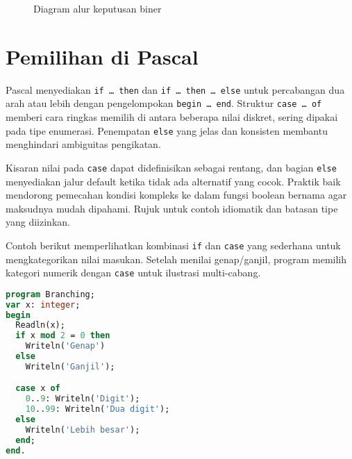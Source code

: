 \documentclass[../main.tex]{subfiles}
\begin{document}
\begin{figure}[h]
  \centering
  \caption{Diagram alur keputusan biner}
  \label{fig:decision-flow}
\end{figure}

\section{Pemilihan di Pascal}
Pascal menyediakan \texttt{if \ldots{} then} dan \texttt{if \ldots{} then \ldots{} else} untuk percabangan dua arah atau lebih dengan pengelompokan \texttt{begin \ldots{} end}. Struktur \texttt{case \ldots{} of} memberi cara ringkas memilih di antara beberapa nilai diskret, sering dipakai pada tipe enumerasi. Penempatan \texttt{else} yang jelas dan konsisten membantu menghindari ambiguitas pengikatan.

Kisaran nilai pada \texttt{case} dapat didefinisikan sebagai rentang, dan bagian \texttt{else} menyediakan jalur default ketika tidak ada alternatif yang cocok. Praktik baik mendorong pemecahan kondisi kompleks ke dalam fungsi boolean bernama agar maksudnya mudah dipahami. Rujuk \textcite{pascal-tutorial-wikibooks} untuk contoh idiomatik dan batasan tipe yang diizinkan.

Contoh berikut memperlihatkan kombinasi \texttt{if} dan \texttt{case} yang sederhana untuk mengkategorikan nilai masukan. Setelah menilai genap/ganjil, program memilih kategori numerik dengan \texttt{case} untuk ilustrasi multi-cabang.

\begin{lstlisting}[language=Pascal, caption={Contoh pemilihan di Pascal}, label={lst:pascal-if}]
program Branching;
var x: integer;
begin
  Readln(x);
  if x mod 2 = 0 then
    Writeln('Genap')
  else
    Writeln('Ganjil');

  case x of
    0..9: Writeln('Digit');
    10..99: Writeln('Dua digit');
  else
    Writeln('Lebih besar');
  end;
end.
\end{lstlisting}
\end{document}

